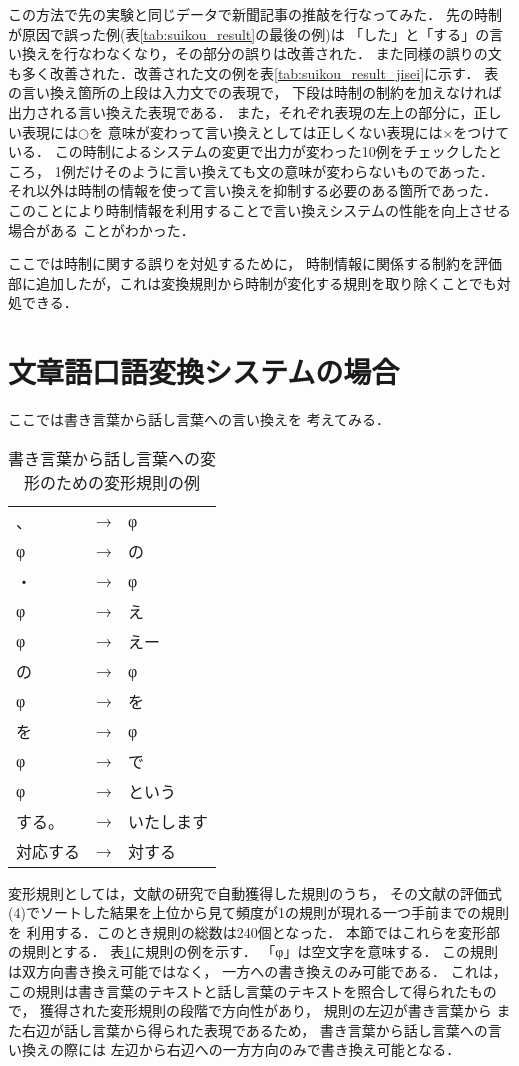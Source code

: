 この方法で先の実験と同じデータで新聞記事の推敲を行なってみた．
先の時制が原因で誤った例(表\ref{tab:suikou_result}の最後の例)は
「した」と「する」の言い換えを行なわなくなり，その部分の誤りは改善された．
また同様の誤りの文も多く改善された．改善された文の例を表\ref{tab:suikou_result_jisei}に示す．
表の言い換え箇所の上段は入力文での表現で，
下段は時制の制約を加えなければ出力される言い換えた表現である．
また，それぞれ表現の左上の部分に，正しい表現には$○$を
意味が変わって言い換えとしては正しくない表現には$×$をつけている．
この時制によるシステムの変更で出力が変わった10例をチェックしたところ，
1例だけそのように言い換えても文の意味が変わらないものであった．
それ以外は時制の情報を使って言い換えを抑制する必要のある箇所であった．
このことにより時制情報を利用することで言い換えシステムの性能を向上させる場合がある
ことがわかった．

ここでは時制に関する誤りを対処するために，
時制情報に関係する制約を評価部に追加したが，これは変換規則から時制が変化する規則を取り除くことでも対処できる．

\section{文章語口語変換システムの場合}

ここでは書き言葉から話し言葉への言い換えを
考えてみる\cite{murata_kaiho_2001,Murata_spoken_written_lrec}．

\begin{table}[t]
  \begin{center}
    \leavevmode
    \caption{書き言葉から話し言葉への変形のための変形規則の例}
    \label{tab:hitode_kisoku_w2s}
\begin{tabular}[h]{|lll|}\hline
、&→&φ\\
φ&→&の\\
・&→&φ\\
φ&→&え\\
φ&→&えー\\
の&→&φ\\
φ&→&を\\
を&→&φ\\
φ&→&で\\
φ&→&という\\
する。&→&いたします\\
対応する&→&対する\\\hline
\end{tabular}
  \end{center}
\end{table}

変形規則としては，文献\cite{murata_kaiho_2001}の研究で自動獲得した規則のうち，
その文献の評価式(4)でソートした結果を上位から見て頻度が1の規則が現れる一つ手前までの規則を
利用する．このとき規則の総数は240個となった．
本節ではこれらを変形部の規則とする．
表\ref{tab:hitode_kisoku_w2s}に規則の例を示す．
「φ」は空文字を意味する．
この規則は双方向書き換え可能ではなく，
一方への書き換えのみ可能である．
これは，この規則は書き言葉のテキストと話し言葉のテキストを照合して得られたもので，
獲得された変形規則の段階で方向性があり，
規則の左辺が書き言葉から
また右辺が話し言葉から得られた表現であるため，
書き言葉から話し言葉への言い換えの際には
左辺から右辺への一方方向のみで書き換え可能となる．

